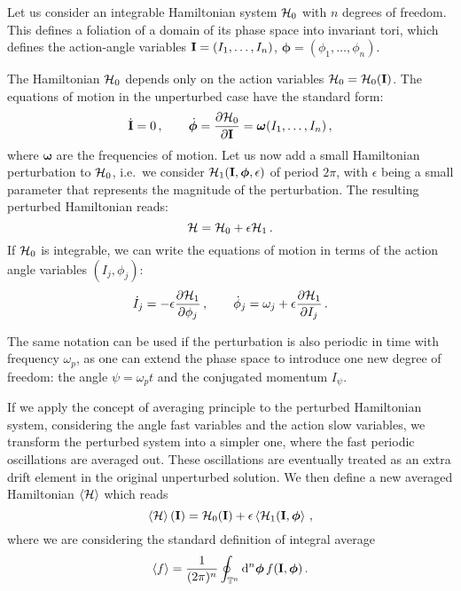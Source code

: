 Let us consider an integrable Hamiltonian system $\mathcal{H}_0$ with $n$ degrees of freedom. This defines a foliation of a domain of its phase space into invariant tori, which defines the action-angle variables $\vb{I}=(I_1, \ldots, I_n)$, $\boldsymbol{\phi}=(\phi_1, \ldots, \phi_n)$. 

The Hamiltonian $\mathcal{H}_0$ depends only on the action variables $\mathcal{H}_0=\mathcal{H}_0(\vb{I})$. The equations of motion in the unperturbed case have the standard form:
\begin{equation}
    \dot{\vb{I}}=0\,, \qquad \dot{\boldsymbol{\phi}} = \pdv{\mathcal{H}_0}{\vb{I}} = \boldsymbol{\omega}(I_1,\dots,I_n) \,,
\end{equation}
where $\boldsymbol{\omega}$ are the frequencies of motion.
Let us now add a small Hamiltonian perturbation to $\mathcal{H}_0$, i.e.\ we consider $\mathcal{H}_1(\vb{I}, \boldsymbol{\phi}, \epsilon)$ of period $2\pi$, with $\epsilon$ being a small parameter that represents the magnitude of the perturbation. The resulting perturbed Hamiltonian reads:
\begin{equation}
    \mathcal{H} = \mathcal{H}_0 + \epsilon \mathcal{H}_1\,.
\end{equation}
%
If $\mathcal{H}_0$ is integrable, we can write the equations of motion in terms of the action angle variables $(I_j,\phi_j)$:
%
\begin{equation}
    \dot I_j = -\epsilon \pdv{\mathcal{H}_1}{\phi_j}\,,\qquad
	\dot \phi_j = \omega_j + \epsilon \pdv{\mathcal{H}_1}{I_j}\, .
\end{equation}
%

The same notation can be used if the perturbation is also periodic in time with frequency $\omega_p$, as one can extend the phase space to introduce one new degree of freedom: the angle $\psi=\omega_p t$ and the conjugated momentum $I_\psi$.

If we apply the concept of averaging principle to the perturbed Hamiltonian system, considering the angle fast variables and the action slow variables,
we transform the perturbed system into a simpler one, where the fast periodic oscillations are averaged out. These oscillations are eventually treated as an extra drift element in the original unperturbed solution. We then define a new averaged Hamiltonian $\left<{\mathcal{H}}\right>$ which reads
%
\begin{equation} 
	\left<{\mathcal{H}}\right>(\vb{I}) = \mathcal{H}_0(\vb{I})+\epsilon \left<{ \mathcal{H}_1(\vb{I}, \boldsymbol{\phi} }\right>\,,
\end{equation}
%
where we are considering the standard definition of integral average
%
\begin{equation} 
	\left<{f}\right> = \frac{1}{(2\pi)^n}\oint_{\mathbb{T}^n}\dd^n\boldsymbol{\phi}\, f(\vb{I}, \boldsymbol{\phi}) \, .
\end{equation}
%

